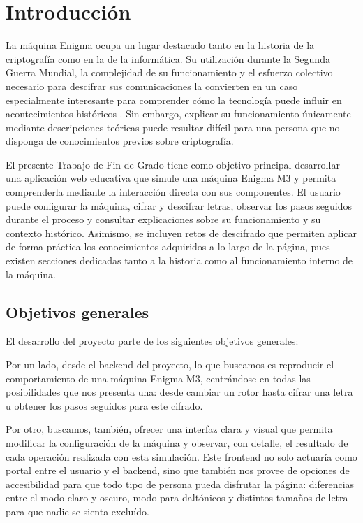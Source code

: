 \chapter{Introducción}

La máquina Enigma ocupa un lugar destacado tanto en la historia de la criptografía
como en la de la informática. Su utilización durante la Segunda Guerra Mundial, la
complejidad de su funcionamiento y el esfuerzo colectivo necesario para descifrar sus
comunicaciones la convierten en un caso especialmente interesante para comprender cómo
la tecnología puede influir en acontecimientos históricos \cite{cryptomuseum_enigma}. Sin embargo, explicar su
funcionamiento únicamente mediante descripciones teóricas puede resultar difícil para
una persona que no disponga de conocimientos previos sobre criptografía.

El presente Trabajo de Fin de Grado tiene como objetivo principal desarrollar una
aplicación web educativa que simule una máquina Enigma M3 y permita comprenderla
mediante la interacción directa con sus componentes. El usuario puede configurar la
máquina, cifrar y descifrar letras, observar los pasos seguidos durante el proceso y
consultar explicaciones sobre su funcionamiento y su contexto histórico. Asimismo, se
incluyen retos de descifrado que permiten aplicar de forma práctica los conocimientos
adquiridos a lo largo de la página, pues existen secciones dedicadas tanto a la historia
como al funcionamiento interno de la máquina.

\section{Objetivos generales}

El desarrollo del proyecto parte de los siguientes objetivos generales:

Por un lado, desde el backend del proyecto, lo que buscamos es reproducir el comportamiento 
de una máquina Enigma M3, centrándose en todas las posibilidades que nos presenta una: 
desde cambiar un rotor hasta cifrar una letra u obtener los pasos seguidos para este cifrado.

Por otro, buscamos, también, ofrecer una interfaz clara y visual que permita modificar
la configuración de la máquina y observar, con detalle, el resultado de cada 
operación realizada con esta simulación. Este frontend no solo actuaría como portal 
entre el usuario y el backend, sino que también nos provee de opciones de accesibilidad 
para que todo tipo de persona pueda disfrutar la página: diferencias entre el modo claro 
y oscuro, modo para daltónicos y distintos tamaños de letra para que nadie se sienta excluído. 

